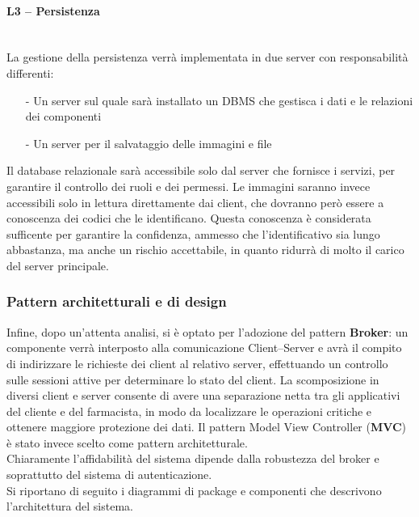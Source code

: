 \paragraph{L3 -- Persistenza}\mbox{}\\
La gestione della persistenza verrà implementata in due server con responsabilità differenti:
\begin{itemize}
    \item[-] Un server sul quale sarà installato un DBMS che gestisca i dati e le relazioni dei componenti
    \item[-] Un server per il salvataggio delle immagini e file
\end{itemize}

Il database relazionale sarà accessibile solo dal server che fornisce i servizi, per garantire il controllo dei ruoli e dei permessi.
Le immagini saranno invece accessibili solo in lettura direttamente dai client, che dovranno però essere a conoscenza dei codici che le identificano.
Questa conoscenza è considerata sufficente per garantire la confidenza, ammesso che l'identificativo sia lungo abbastanza, 
ma anche un rischio accettabile, in quanto ridurrà di molto il carico del server principale. 

\subsubsection{Pattern architetturali e di design}

Infine, dopo un'attenta analisi, si è optato per l'adozione del pattern \textbf{Broker}:
un componente verrà interposto alla comunicazione Client--Server e avrà il compito di indirizzare le richieste dei client al relativo server,
effettuando un controllo sulle sessioni attive per determinare lo stato del client.
La scomposizione in diversi client e server consente di avere una separazione netta tra gli applicativi del cliente e del farmacista,
in modo da localizzare le operazioni critiche e ottenere maggiore protezione dei dati.
Il pattern Model View Controller (\textbf{MVC}) è stato invece scelto come pattern architetturale.
\\
Chiaramente l'affidabilità del sistema dipende dalla robustezza del broker e soprattutto del sistema di autenticazione.
\\
Si riportano di seguito i diagrammi di package e componenti che descrivono l'architettura del sistema.

\newpage

